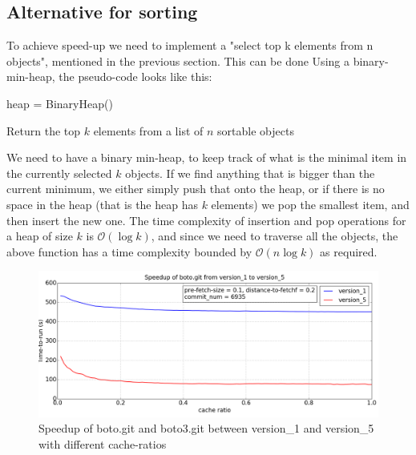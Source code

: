 \documentclass[12pt,twoside,notitlepage]{report}
\begin{document}
\subsection{Alternative for sorting}
To achieve speed-up we need to implement a "select top k elements from n objects", mentioned in the previous section. This can be done Using a binary-min-heap, the pseudo-code looks like this:
\vspace{1em}
\begin{algorithm}[H]
heap = BinaryHeap()\\
\caption{Return the top $k$ elements from a list of $n$ sortable objects}
\end{algorithm}
\vspace{1em}
We need to have a binary min-heap, to keep track of what is the minimal item in the currently selected $k$ objects. If we find anything that is bigger than the current minimum, we either simply push that onto the heap, or if there is no space in the heap (that is the heap has $k$ elements) we pop the smallest item, and then insert the new one. The time complexity of insertion and pop operations for a heap of size $k$ is $\mathcal{O}(\log{k})$, and since we need to traverse all the objects, the above function has a time complexity bounded by $\mathcal{O}(n\log{k})$ as required.
\begin{figure}[h]
\includegraphics[width=1.0\textwidth]{speedup.png}

\caption{Speedup of boto.git and boto3.git between version\_1 and version\_5 with different cache-ratios}
\label{fig:speedup}
\end{figure}
\end{document}
